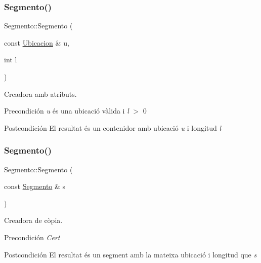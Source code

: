 \subsubsection{\texorpdfstring{Segmento()}{Segmento()}\hspace{0.1cm}{\footnotesize\ttfamily [2/3]}}
{\footnotesize\ttfamily Segmento\+::\+Segmento (\begin{DoxyParamCaption}\item[{const \hyperlink{class_ubicacion}{Ubicacion} \&}]{u,  }\item[{int}]{l }\end{DoxyParamCaption})}



Creadora amb atributs. 

\begin{DoxyPrecond}{Precondición}
{\itshape u} és una ubicació vàlida i {\itshape l} $>$ 0 
\end{DoxyPrecond}
\begin{DoxyPostcond}{Postcondición}
El resultat és un contenidor amb ubicació {\itshape u} i longitud {\itshape l} 
\end{DoxyPostcond}
\mbox{\label{class_segmento_a18576aa0c0d5d4200e23b84d760b5aa3}} 
\subsubsection{\texorpdfstring{Segmento()}{Segmento()}\hspace{0.1cm}{\footnotesize\ttfamily [3/3]}}
{\footnotesize\ttfamily Segmento\+::\+Segmento (\begin{DoxyParamCaption}\item[{const \hyperlink{class_segmento}{Segmento} \&}]{s }\end{DoxyParamCaption})}



Creadora de còpia. 

\begin{DoxyPrecond}{Precondición}
{\itshape Cert} 
\end{DoxyPrecond}
\begin{DoxyPostcond}{Postcondición}
El resultat és un segment amb la mateixa ubicació i longitud que {\itshape s} 
\end{DoxyPostcond}
\mbox{\label{class_segmento_a7a9ecb38532ea633aacdaa90be7c4769}} 
